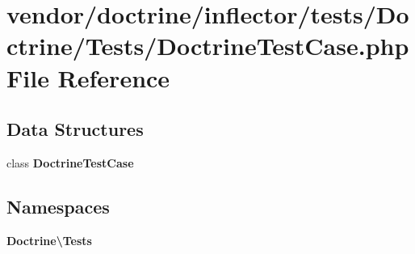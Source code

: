 \section{vendor/doctrine/inflector/tests/\+Doctrine/\+Tests/\+Doctrine\+Test\+Case.php File Reference}
\label{_doctrine_test_case_8php}
\subsection*{Data Structures}
\begin{DoxyCompactItemize}
\item 
class {\bf Doctrine\+Test\+Case}
\end{DoxyCompactItemize}
\subsection*{Namespaces}
\begin{DoxyCompactItemize}
\item 
 {\bf Doctrine\textbackslash{}\+Tests}
\end{DoxyCompactItemize}
